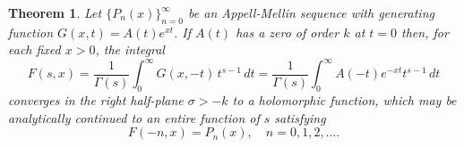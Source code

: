 \documentclass[11pt,a4paper]{amsart}
\theoremstyle{plain}
\newtheorem{theorem}{Theorem}
\theoremstyle{plain}
\theoremstyle{definition}
\theoremstyle{remark}
\begin{document}
\begin{theorem}
\label{T:general_Appell-Mellin_relation}
Let $\{P_{n}(x)\}_{n=0}^{\infty}$ be an Appell-Mellin sequence with generating function $G(x,t) = A(t) e^{xt}$. If $A(t)$ has a zero of order $k$ at $t = 0$ then, for each fixed $x > 0$, the integral
\begin{equation}
\label{E:Mellin}
    F(s,x) = \frac{1}{\Gamma(s)}\int_{0}^{\infty} G(x,-t)\,t^{s-1}\,dt 
	       = \frac{1}{\Gamma(s)} \int_{0}^{\infty} A(-t) e^{-xt} t^{s-1}\,dt
\end{equation}
converges in the right half-plane $\sigma > -k$ to a holomorphic function, which may be  analytically continued to an entire function of $s$ satisfying
\begin{equation*}
	F(-n,x)=P_{n}(x),\quad n=0,1,2,\dots.
\end{equation*}
\end{theorem}
\end{document}
